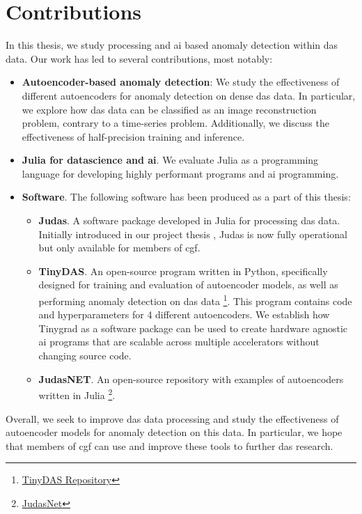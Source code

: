 \section{Contributions}

In this thesis, we study processing and \acrshort{ai} based anomaly detection within \acrshort{das} data.
Our work has led to several contributions, most notably:

\begin{itemize}
    \item \textbf{Autoencoder-based anomaly detection}: We study the effectiveness of different autoencoders for anomaly detection on dense \acrshort{das} data. In particular, we explore how \acrshort{das} data can be classified as an image reconstruction problem, contrary to a time-series problem. Additionally, we discuss the effectiveness of half-precision training and inference.
    \item \textbf{Julia for datascience and \acrshort{ai}}. We evaluate Julia as a programming language for developing highly performant programs and \acrshort{ai} programming.
    \item \textbf{Software}. The following software has been produced as a part of this thesis:
    \begin{itemize}
        \item \textbf{Judas}. A software package developed in Julia for processing \acrshort{das} data. Initially introduced in our project thesis \cite{projthesis}, Judas is now fully operational but only available for members of \acrshort{cgf}. \\
        \item \textbf{TinyDAS}. An open-source program written in Python, specifically designed for training and evaluation of autoencoder models, as well as performing anomaly detection on \acrshort{das} data \footnote{\href{github.com/Jafagervik/TinyDAS}{TinyDAS Repository}}. This program contains code and hyperparameters for 4 different autoencoders.  We establish how Tinygrad \cite{tinygrad} as a software package can be used to create hardware agnostic \acrshort{ai} programs that are scalable across multiple accelerators without changing source code. \\
        \item \textbf{JudasNET}. An open-source repository with examples of autoencoders written in Julia \footnote{\href{github.com}{JudasNet}}.
    \end{itemize}
\end{itemize}

Overall, we seek to improve \acrshort{das} data processing and study the effectiveness of autoencoder models for anomaly detection on this data. In particular, we hope that members of \acrshort{cgf} can use and improve these tools to further \acrshort{das} research.